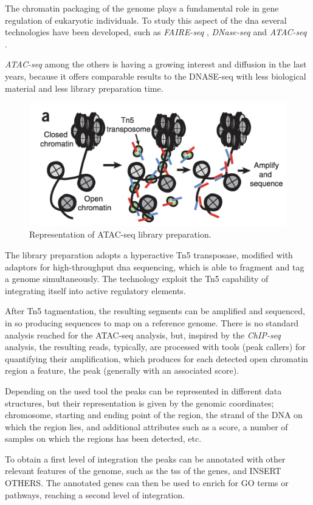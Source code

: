 The chromatin packaging of the genome plays a fundamental role in gene regulation of eukaryotic individuals.
To study this aspect of the \gls{dna} several technologies have been developed, such as \textit{FAIRE-seq} \cite{Giresi2007}, \textit{DNase-seq} \cite{Winter2013} and \textit{ATAC-seq} \cite{Buenrostro2013}.

\textit{ATAC-seq} among the others is having a growing interest and diffusion in the last years, because it offers comparable results to the DNASE-seq with less biological material and less library preparation time.

\begin{figure}[h]
\includegraphics[width=\textwidth,height=\textheight,keepaspectratio]{img/intro/atac.png}
\caption[ATAC-seq experiment]{Representation of ATAC-seq library preparation. \cite{Buenrostro2013}}
\label{fig:atacseqexp}
\centering
\end{figure}

The library preparation adopts a hyperactive Tn5 transposase, modified with adaptors for high-throughput  \gls{dna} sequencing, which is able to fragment and tag a genome simultaneously.
The technology exploit the Tn5 capability of integrating itself into active regulatory elements.

After Tn5 tagmentation, the resulting segments can be amplified and sequenced, in so producing sequences  to map on a reference genome.
There is no standard analysis reached for the ATAC-seq analysis, but, inspired by the \textit{ChIP-seq} analysis, the resulting reads, typically, are processed with tools (peak callers) for quantifying their amplification, which produces for each detected open chromatin region a feature, the peak (generally with an associated score). 

Depending on the used tool the peaks can be represented in different data structures, but their representation is given by the genomic coordinates; chromosome, starting and ending point of the region, the strand of the DNA on which the region lies, and additional attributes such as a score, a number of samples on which the regions has been detected, etc.

To obtain a first level of integration the peaks can be annotated with other relevant features of the genome, such as the \gls{tss} of the genes, and INSERT OTHERS.  
The annotated genes can then be used to enrich for GO terms or pathways, reaching a second level of integration.




